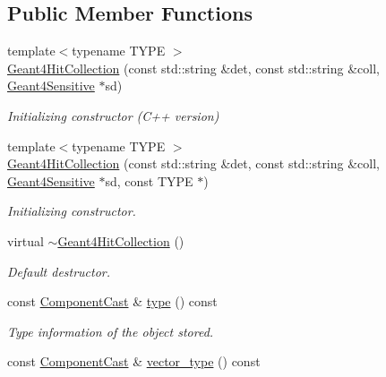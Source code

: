 \subsection*{Public Member Functions}
\begin{DoxyCompactItemize}
\item 
{\footnotesize template$<$typename T\+Y\+PE $>$ }\\\hyperlink{class_d_d4hep_1_1_simulation_1_1_geant4_hit_collection_a8b32b65a07b61a5a5bd339ea39ef2e0f}{Geant4\+Hit\+Collection} (const std\+::string \&det, const std\+::string \&coll, \hyperlink{class_d_d4hep_1_1_simulation_1_1_geant4_sensitive}{Geant4\+Sensitive} $\ast$sd)
\begin{DoxyCompactList}\small\item\em Initializing constructor (C++ version) \end{DoxyCompactList}\item 
{\footnotesize template$<$typename T\+Y\+PE $>$ }\\\hyperlink{class_d_d4hep_1_1_simulation_1_1_geant4_hit_collection_a1dee728d2371ec8a5262395e484d6a8b}{Geant4\+Hit\+Collection} (const std\+::string \&det, const std\+::string \&coll, \hyperlink{class_d_d4hep_1_1_simulation_1_1_geant4_sensitive}{Geant4\+Sensitive} $\ast$sd, const T\+Y\+PE $\ast$)
\begin{DoxyCompactList}\small\item\em Initializing constructor. \end{DoxyCompactList}\item 
virtual \hyperlink{class_d_d4hep_1_1_simulation_1_1_geant4_hit_collection_a2e586ee3c0a22239858669a4d310e386}{$\sim$\+Geant4\+Hit\+Collection} ()
\begin{DoxyCompactList}\small\item\em Default destructor. \end{DoxyCompactList}\item 
const \hyperlink{class_d_d4hep_1_1_component_cast}{Component\+Cast} \& \hyperlink{class_d_d4hep_1_1_simulation_1_1_geant4_hit_collection_a6fc23e64aca4b8371fe3ee19ac7c3add}{type} () const
\begin{DoxyCompactList}\small\item\em Type information of the object stored. \end{DoxyCompactList}\item 
const \hyperlink{class_d_d4hep_1_1_component_cast}{Component\+Cast} \& \hyperlink{class_d_d4hep_1_1_simulation_1_1_geant4_hit_collection_aaf72f344cf60e69b9af3e518475d0be5}{vector\+\_\+type} () const

\end{DoxyCompactItemize}

